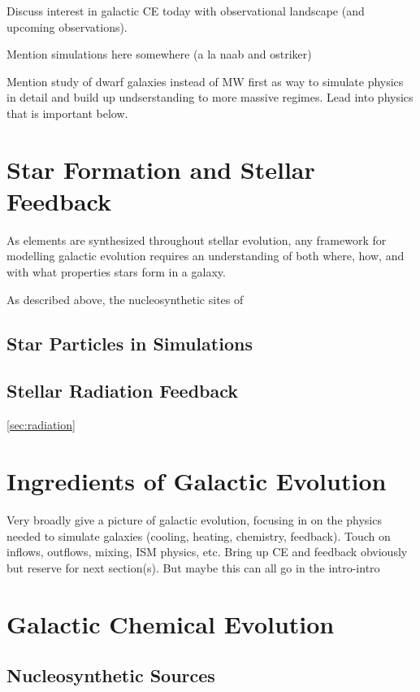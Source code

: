 Discuss interest in galactic CE today with observational landscape (and upcoming observations). 

Mention simulations here somewhere (a la naab and ostriker)

Mention study of dwarf galaxies instead of MW first as way to simulate physics in detail and build up undserstanding to more massive regimes. Lead into physics that is important below.


\section{Star Formation and Stellar Feedback}\label{sec:section1}

As elements are synthesized throughout stellar evolution, any framework for modelling galactic evolution requires an understanding of both where, how, and with what properties stars form in a galaxy. 

As described above, the nucleosynthetic sites of 


\subsection{Star Particles in Simulations}

\subsection{Stellar Radiation Feedback}
\ref{sec:radiation}


\section{Ingredients of Galactic Evolution}

Very broadly give a picture of galactic evolution, focusing in on the physics needed to simulate galaxies (cooling, heating, chemistry, feedback). Touch on inflows, outflows, mixing, ISM physics, etc. Bring up CE and feedback obviously but reserve for next section(s). But maybe this can all go in the intro-intro

\section{Galactic Chemical Evolution}
\label{sec:CE}

\subsection{Nucleosynthetic Sources}

